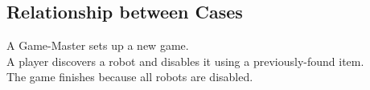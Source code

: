 \documentclass{article}
\begin{document}
\subsection{Relationship between Cases}
A Game-Master sets up a new game.\\
A player discovers a robot and disables it using a previously-found item.\\
The game finishes because all robots are disabled.\\
\end{document}
